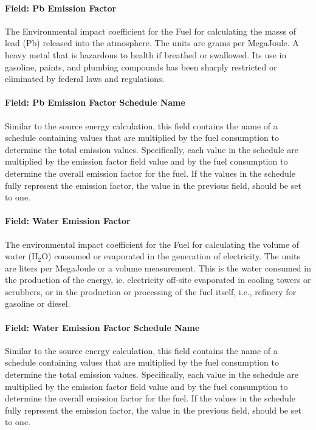 \paragraph{Field: Pb Emission Factor}\label{field-pb-emission-factor}

The Environmental impact coefficient for the Fuel for calculating the masss of lead (Pb) released into the atmosphere. The units are grams per MegaJoule. A heavy metal that is hazardous to health if breathed or swallowed. Its use in gasoline, paints, and plumbing compounds has been sharply restricted or eliminated by federal laws and regulations.

\paragraph{Field: Pb Emission Factor Schedule Name}\label{field-pb-emission-factor-schedule-name}

Similar to the source energy calculation, this field contains the name of a schedule containing values that are multiplied by the fuel consumption to determine the total emission values. Specifically, each value in the schedule are multiplied by the emission factor field value and by the fuel consumption to determine the overall emission factor for the fuel. If the values in the schedule fully represent the emission factor, the value in the previous field, should be set to one.

\paragraph{Field: Water Emission Factor}\label{field-water-emission-factor}

The environmental impact coefficient for the Fuel for calculating the volume of water (H\(_{2}\)O) consumed or evaporated in the generation of electricity. The units are liters per MegaJoule or a volume measurement. This is the water consumed in the production of the energy, ie. electricity off-site evaporated in cooling towers or scrubbers, or in the production or processing of the fuel itself, i.e., refinery for gasoline or diesel.

\paragraph{Field: Water Emission Factor Schedule Name}\label{field-water-emission-factor-schedule-name}

Similar to the source energy calculation, this field contains the name of a schedule containing values that are multiplied by the fuel consumption to determine the total emission values. Specifically, each value in the schedule are multiplied by the emission factor field value and by the fuel consumption to determine the overall emission factor for the fuel. If the values in the schedule fully represent the emission factor, the value in the previous field, should be set to one.

